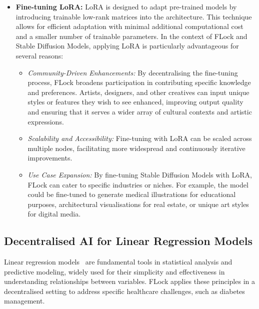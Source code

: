 \documentclass[conference]{IEEEtran}
\begin{document}
\begin{itemize}
    \item \textbf{Fine-tuning LoRA:} LoRA is designed to adapt pre-trained models by introducing trainable low-rank matrices into the architecture. This technique allows for efficient adaptation with minimal additional computational cost and a smaller number of trainable parameters. In the context of FLock and Stable Diffusion Models, applying LoRA is particularly advantageous for several reasons:
\begin{itemize}
    \item \emph{Community-Driven Enhancements:} By decentralising the fine-tuning process, FLock broadens participation in contributing specific knowledge and preferences. Artists, designers, and other creatives can input unique styles or features they wish to see enhanced, improving output quality and ensuring that it serves a wider array of cultural contexts and artistic expressions.

 \item \emph{Scalability and Accessibility:} Fine-tuning with LoRA can be scaled across multiple nodes, facilitating more widespread and continuously iterative improvements.

 \item \emph{Use Case Expansion:} By fine-tuning Stable Diffusion Models with LoRA, FLock can cater to specific industries or niches. For example, the model could be fine-tuned to generate medical illustrations for educational purposes, architectural visualisations for real estate, or unique art styles for digital media.

\end{itemize}
\end{itemize}





\subsection{Decentralised AI for Linear Regression Models}

Linear regression models~\cite{montgomery2021introduction} are fundamental tools in statistical analysis and predictive modeling, widely used for their simplicity and effectiveness in understanding relationships between variables. FLock applies these principles in a decentralised setting to address specific healthcare challenges, such as diabetes management.
\end{document}
